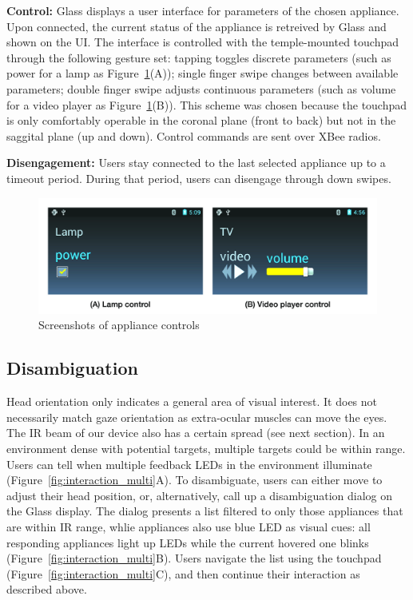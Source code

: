{\bf Control:} Glass displays a user interface for parameters of the chosen appliance. Upon connected, the current status of the appliance is retreived by Glass and shown on the UI. The interface is controlled with the temple-mounted touchpad through the following gesture set: tapping toggles discrete parameters (such as power for a lamp as Figure~\ref{fig:ui_controls}(A)); single finger swipe changes between available parameters; double finger swipe adjusts continuous parameters (such as volume for a video player as Figure~\ref{fig:ui_controls}(B)). This scheme was chosen because the touchpad is only comfortably operable in the coronal plane (front to back) but not in the saggital plane (up and down). 
Control commands are sent over XBee radios.

{\bf Disengagement:} Users stay connected to the last selected appliance up to a timeout period. During that period, users can disengage through down swipes.

\begin{figure}[t!]
\centering
\includegraphics[width=\columnwidth]{figures/ui_controls_caption.jpg}
\caption{Screenshots of appliance controls}
\label{fig:ui_controls}
\end{figure}

\subsection{Disambiguation}
Head orientation only indicates a general area of visual interest. It does not necessarily match gaze orientation as extra-ocular muscles can move the eyes. The IR beam of our device also has a certain spread (see next section). In an environment dense with potential targets, multiple targets could be within range. Users can tell when multiple feedback LEDs in the environment illuminate (Figure~\ref{fig:interaction_multi}A). To disambiguate, users can either move to adjust their head position, or, alternatively, call up a disambiguation dialog on the Glass display. The dialog presents a list filtered to only those appliances that are within IR range, whlie appliances also use blue LED as visual cues: all responding appliances light up LEDs while the current hovered one blinks (Figure~\ref{fig:interaction_multi}B). Users navigate the list using the touchpad (Figure~\ref{fig:interaction_multi}C), and then continue their interaction as described above.
